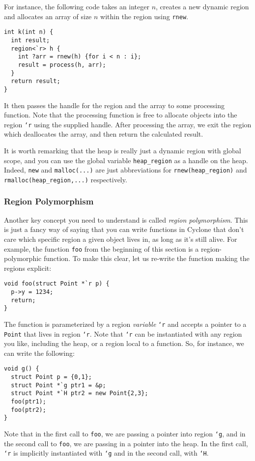 For instance, the following code takes an integer $n$, creates
a new dynamic region and allocates an array of size
$n$ within the region using \texttt{rnew}.  
\begin{verbatim}
int k(int n) {
  int result;
  region<`r> h {
    int ?arr = rnew(h) {for i < n : i};
    result = process(h, arr);
  }
  return result;
}
\end{verbatim}
It then passes the
handle for the region and the array to some processing function.
Note that the processing function is free to allocate objects
into the region \texttt{`r} using the supplied handle.  
After processing the array, we exit the region which deallocates
the array, and then return the calculated result.

It is worth remarking that the heap is really just a dynamic region
with global scope, and you can use the global variable \texttt{heap_region}
as a handle on the heap.  Indeed, \texttt{new} and \texttt{malloc(...)}
are just abbreviations for \texttt{rnew(heap_region)} and
\texttt{rmalloc(heap_region,...)} respectively.  

\subsubsection*{Region Polymorphism}

Another key concept you need to understand is called
\emph{region polymorphism}.  This is just a fancy way of saying
that you can write functions in Cyclone that don't care which
specific region a given object lives in, as long as it's still
alive.  For example, the function \texttt{foo} from the beginning
of this section is a region-polymorphic function.  To make this
clear, let us re-write the function making the regions explicit:
\begin{verbatim}
void foo(struct Point *`r p) {
  p->y = 1234;
  return;
}
\end{verbatim}
The function is parameterized by a region \emph{variable} \texttt{`r}
and accepts a pointer to a \texttt{Point} that lives in region
\texttt{`r}.  Note that \texttt{`r} can be instantiated with
any region you like, including the heap, or a region local to
a function.  So, for instance, we can write the following:
\begin{verbatim}
void g() {
  struct Point p = {0,1};
  struct Point *`g ptr1 = &p;
  struct Point *`H ptr2 = new Point{2,3};
  foo(ptr1);
  foo(ptr2);
}
\end{verbatim}
Note that in the first call to \texttt{foo}, we are passing
a pointer into region \texttt{`g}, and in the second call to 
\texttt{foo}, we are passing in a pointer into the heap.  In
the first call, \texttt{`r} is implicitly instantiated with
\texttt{`g} and in the second call, with \texttt{`H}.  

